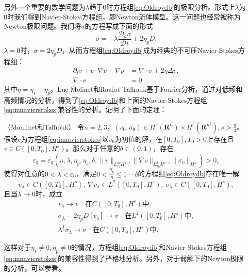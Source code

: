另外一个重要的数学问题为$\lambda$趋于$0$时方程组\eqref{eq:Oldroydb}的极限分析。形式上$\lambda$为$0$时我们得到Navier-Stokes方程组，即Newton流体模型。这一问题也经常被称为Newton极限问题。我们将$\sigma$的方程写成下面的形式
\begin{equation*}
	 \sigma = -	\lambda \frac{\mathcal{D}_a \sigma}{\mathcal{D} t} +  2 \eta_p D.
\end{equation*}
$\lambda=0$时，$\sigma= 2 \eta_p D$，从而方程组\eqref{eq:Oldroydb}成为经典的不可压Navier-Stokes方程组：
\begin{subequations} \label{eq:innavierstokes}
\begin{align}
	\partial_t v + v \cdot \nabla v  + \nabla p &= \nabla \cdot \sigma + 2 \eta \Delta v, \\
	\nabla \cdot v &= 0.
\end{align}
\end{subequations}
其中$\eta= \eta_s + \eta_p$。Luc Molinet和Raafat Talhouk基于Fourier分析，通过对低频和高频情况的分析，得到了\eqref{eq:Oldroydb}和上面的Navier-Stokes方程组\eqref{eq:innavierstokes}兼容性的分析。证明了下面的定理：
\begin{theorem}（Monlinet和Talhouk\cite{molinet2008newtonian}）
	令$n=2,3$，$(v_0,\sigma_0) \in H^s(\mathbf{R}^n) \times H^s(\mathbf{R}^{n^2}), s>\frac{n}{2}$。假设$v$为方程组\eqref{eq:innavierstokes}以$v_0$为初值的解，在$[0,T_0],T_0>0$上存在且$v \in C([0,T_0],H^s)$。那么对于任意的$\delta \in (0,1)$，存在
	\begin{equation*}
		\varepsilon_0 = \varepsilon_0 (n,\lambda,\eta_p,\eta_s,\delta, \|v\|_{{L_{T_0}^\infty}H^s}, \|\nabla v\|_{{L^2_{T_0}}H^s}, \|\sigma_0\|_{H^s}) >0,
	\end{equation*}
	使得对任意的$0 < \lambda < \varepsilon_0$，满足$0 < \frac{\eta_p}{\eta} \le 1- \delta$的方程组\eqref{eq:Oldroydb}存在唯一解
	\begin{equation*}
		v_\lambda \in C([0,T_0],H^s),\ \nabla v_{\lambda} \in L^2([0,T_0],H^s), \ \sigma_{\lambda} \in C ([0,T_0],H^s),
	\end{equation*}
	且当$\lambda \rightarrow 0$时，成立
	\begin{eqnarray*}
		v_\lambda \rightarrow v \quad \text{在} C([0,T_0],H^s) \text{中}, \\ 
		\sigma_\lambda - 2\eta_p D[v_\lambda]  \rightarrow v \quad \text{在} L^2([0,T_0],H^s) \text{中}, \\ 
		\lambda^{\frac{1}{2}} \sigma_\lambda \rightarrow v \quad \text{在} C([0,T_0],H^s) \text{中}.
	\end{eqnarray*}
\end{theorem}
这样对于$\eta_s \neq 0, \eta_p \neq 0$的情况，方程组\eqref{eq:Oldroydb}和Navier-Stokes方程组\eqref{eq:innavierstokes}的兼容性得到了严格地分析。另外，对于弱解下的Newton极限的分析，可以参看\cite{bresch2014newtonian}。


